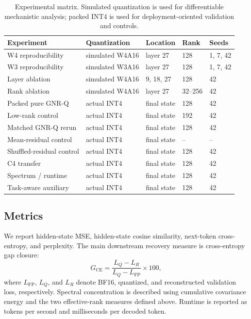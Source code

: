 \documentclass[11pt]{article}
\begin{document}
\begin{table}[t]
\centering
\small
\begin{tabular}{lllll}
\toprule
Experiment & Quantization & Location & Rank & Seeds \\
\midrule
W4 reproducibility & simulated W4A16 & layer 27 & 128 & 1, 7, 42 \\
W3 reproducibility & simulated W3A16 & layer 27 & 128 & 1, 7, 42 \\
Layer ablation & simulated W4A16 & 9, 18, 27 & 128 & 42 \\
Rank ablation & simulated W4A16 & layer 27 & 32--256 & 42 \\
Packed pure GNR-Q & actual INT4 & final state & 128 & 42 \\
Low-rank control & actual INT4 & final state & 192 & 42 \\
Matched GNR-Q rerun & actual INT4 & final state & 128 & 42 \\
Mean-residual control & actual INT4 & final state & -- & -- \\
Shuffled-residual control & actual INT4 & final state & 128 & 42 \\
C4 transfer & actual INT4 & final state & 128 & 42 \\
Spectrum / runtime & actual INT4 & final state & 128 & 42 \\
Task-aware auxiliary & actual INT4 & final state & 128 & 42 \\
\bottomrule
\end{tabular}
\caption{Experimental matrix. Simulated quantization is used for differentiable mechanistic analysis; packed INT4 is used for deployment-oriented validation and controls.}
\label{tab:matrix}
\end{table}

\subsection{Metrics}

We report hidden-state MSE, hidden-state cosine similarity, next-token cross-entropy, and perplexity. The main downstream recovery measure is cross-entropy gap closure:
\begin{equation}
 G_{\mathrm{CE}}
 =
 \frac{L_Q-L_R}{L_Q-L_{\mathrm{FP}}}\times 100,
\end{equation}
where $L_{\mathrm{FP}}$, $L_Q$, and $L_R$ denote BF16, quantized, and reconstructed validation loss, respectively. Spectral concentration is described using cumulative covariance energy and the two effective-rank measures defined above. Runtime is reported as tokens per second and milliseconds per decoded token.
\end{document}
